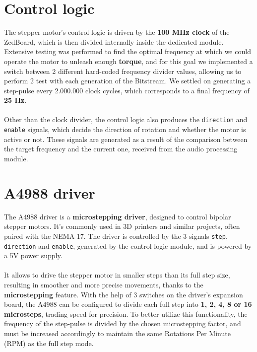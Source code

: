 \section{Control logic}

The stepper motor's control logic is driven by the \textbf{100 MHz clock} of the ZedBoard,
which is then divided internally inside the dedicated module.
Extensive testing was performed to find the optimal frequency at which we could operate
the motor to unleash enough \textbf{torque}, and for this goal we implemented a switch between 2
different hard-coded frequency divider values, allowing us to perform 2 test with each generation of the Bitstream.
We settled on generating a step-pulse every 2.000.000 clock cycles,
which corresponds to a final frequency of \textbf{25 Hz}.
\paragraph{}

Other than the clock divider, the control logic also produces the \texttt{direction} and
\texttt{enable} signals, which decide the direction of rotation and whether the motor is active or not.
These signals are generated as a result of the comparison between the target frequency and
the current one, received from the audio processing module.


\section{A4988 driver}

The A4988 driver is a \textbf{microstepping driver}, designed to control bipolar stepper motors.
It's commonly used in 3D printers and similar projects, often paired with the NEMA 17.
The driver is controlled by the 3 signals \texttt{step}, \texttt{direction} and \texttt{enable},
generated by the control logic module, and is powered by a 5V power supply.
\paragraph{}

It allows to drive the stepper motor in smaller steps than its full step size,
resulting in smoother and more precise movements, thanks to the \textbf{microstepping} feature.
With the help of 3 switches on the driver's expansion board, the A4988 can be
configured to divide each full step into \textbf{1, 2, 4, 8 or 16 microsteps}, trading speed for precision.
To better utilize this functionality, the frequency of the step-pulse is
divided by the chosen microstepping factor, and must be increased accordingly
to maintain the same Rotations Per Minute (RPM) as the full step mode.
